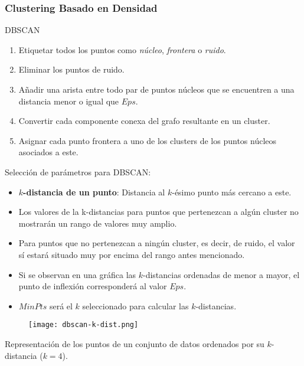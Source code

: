 \begin{frame}
    \frametitle{Clustering Basado en Densidad}

    \begin{block}{DBSCAN}
        \begin{enumerate}
            \item<2-> Etiquetar todos los puntos como \textit{núcleo}, \textit{frontera} o \textit{ruido}.
            \item<3-> Eliminar los puntos de ruido.
            \item<4-> Añadir una arista entre todo par de puntos núcleos que se encuentren a una distancia menor o igual que $Eps$.
            \item<5-> Convertir cada componente conexa del grafo resultante en un cluster.
            \item<6-> Asignar cada punto frontera a uno de los clusters de los puntos núcleos asociados a este.
        \end{enumerate}
    \end{block}

\end{frame}

\begin{frame}

    Selección de parámetros para DBSCAN:

    \begin{itemize}
        \item<2-> \textbf{$k$-distancia de un punto}: Distancia al $k$-ésimo punto más cercano a este.
        \item<3-> Los valores de la k-distancias para puntos que pertenezcan a algún cluster no mostrarán un rango de valores muy amplio.
        \item<4-> Para puntos que no pertenezcan a ningún cluster, es decir, de ruido, el valor sí estará situado muy por encima del rango antes mencionado.
        \item<5-> Si se observan en una gráfica las $k$-distancias ordenadas de menor a mayor, el punto de inflexión corresponderá al valor $Eps$.
        \item<6-> $MinPts$ será el $k$ seleccionado para calcular las $k$-distancias.
    \end{itemize}

\end{frame}

\begin{frame}

    \begin{figure}[!h]
        \centering
        \texttt{[image: dbscan-k-dist.png]}
    \end{figure}

    {\footnotesize
    Representación de los puntos de un conjunto de datos ordenados por su $k$-distancia ($k=4$).
    }

\end{frame}

